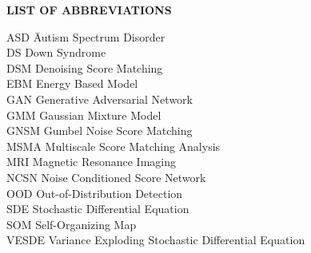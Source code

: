 {}

\begin{center}
{\normalfont \textbf{LIST OF ABBREVIATIONS}}
\end{center}

\newcommand{\Ab}[2]{\noindent  #1 \> #2 \\}
\newcommand{\Abi}[2]{\noindent #1 \hspace{1.5cm} \= #2 \\}

\begin{tabbing}
\Abi{ASD}{Autism Spectrum Disorder}
\Ab{DS}{Down Syndrome}
\Ab{DSM}{Denoising Score Matching}
\Ab{EBM}{Energy Based Model}
\Ab{GAN}{Generative Adversarial Network}
\Ab{GMM}{Gaussian Mixture Model}
\Ab{GNSM}{Gumbel Noise Score Matching}
\Ab{MSMA}{Multiscale Score Matching Analysis}
\Ab{MRI}{Magnetic Resonance Imaging}
\Ab{NCSN}{Noise Conditioned Score Network}
\Ab{OOD}{Out-of-Distribution Detection}
\Ab{SDE}{Stochastic Differential Equation}
\Ab{SOM}{Self-Organizing Map}
\Ab{VESDE}{Variance Exploding Stochastic Differential Equation}

\end{tabbing}

\clearpage
